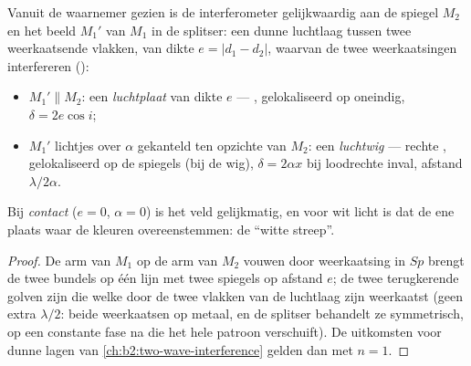 \begin{proposition}\label{prop:b2:michelson:equivalent}
Vanuit de waarnemer gezien is de interferometer gelijkwaardig aan de
spiegel $M_2$ en het beeld $M_1'$ van $M_1$ in de splitser: een dunne
luchtlaag tussen twee weerkaatsende vlakken, van dikte $e = |d_1 - d_2|$,
waarvan de twee weerkaatsingen interfereren ():
\begin{itemize}
  \item $M_1' \parallel M_2$: een \emph{luchtplaat} van dikte $e$ --- , gelokaliseerd op oneindig, $\delta = 2e\cos i$;
  \item $M_1'$ lichtjes over $\alpha$ gekanteld ten opzichte van $M_2$: een
        \emph{luchtwig}
        --- rechte , gelokaliseerd op de
        spiegels (bij de wig), $\delta = 2\alpha x$ bij loodrechte inval,
        afstand $\lambda/2\alpha$.
\end{itemize}
Bij \emph{contact} ($e = 0$, $\alpha = 0$) is het veld gelijkmatig, en voor wit
licht is dat de ene plaats waar de kleuren overeenstemmen: de ``witte streep''.
\end{proposition}

\begin{proof}
De arm van $M_1$ op de arm van $M_2$ vouwen door weerkaatsing in $Sp$ brengt
de twee bundels op één lijn met twee spiegels op afstand $e$; de twee
terugkerende golven zijn die welke door de twee
vlakken van de luchtlaag zijn weerkaatst (geen extra $\lambda/2$: beide
weerkaatsen op metaal, en de splitser behandelt ze symmetrisch, op een
constante fase na die het hele patroon verschuift). De uitkomsten voor
dunne lagen van \cref{ch:b2:two-wave-interference} gelden dan met $n = 1$.
\end{proof}

